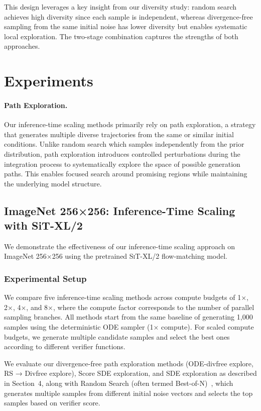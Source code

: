 \documentclass{article}
\begin{document}
This design leverages a key insight from our diversity study: random search achieves high diversity since each sample is independent, whereas divergence-free sampling from the same initial noise has lower diversity but enables systematic local exploration. The two-stage combination captures the strengths of both approaches.


\section{Experiments}

\paragraph{Path Exploration.}
Our inference-time scaling methods primarily rely on path exploration, a strategy that generates multiple diverse trajectories from the same or similar initial conditions. Unlike random search which samples independently from the prior distribution, path exploration introduces controlled perturbations during the integration process to systematically explore the space of possible generation paths. This enables focused search around promising regions while maintaining the underlying model structure.

\subsection{ImageNet 256×256: Inference-Time Scaling with SiT-XL/2}

We demonstrate the effectiveness of our inference-time scaling approach on ImageNet 256×256 using the pretrained \textsc{SiT-XL/2} flow-matching model.

\subsubsection{Experimental Setup}

We compare five inference-time scaling methods across compute budgets of 1×, 2×, 4×, and 8×, where the compute factor corresponds to the number of parallel sampling branches. All methods start from the same baseline of generating 1,000 samples using the deterministic ODE sampler (1× compute). For scaled compute budgets, we generate multiple candidate samples and select the best ones according to different verifier functions.

We evaluate our divergence-free path exploration methods (ODE-divfree explore, RS → Divfree explore), Score SDE exploration, and SDE exploration as described in Section~4, along with Random Search (often termed Best-of-N)~\cite{ma2025diffits}, which generates multiple samples from different initial noise vectors and selects the top samples based on verifier score.
\end{document}
